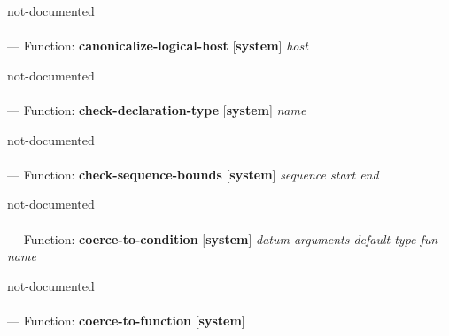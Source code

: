 \begin{adjustwidth}{5em}{5em}
not-documented
\end{adjustwidth}

\paragraph{}
\label{SYSTEM:CANONICALIZE-LOGICAL-HOST}
--- Function: \textbf{canonicalize-logical-host} [\textbf{system}] \textit{host}

\begin{adjustwidth}{5em}{5em}
not-documented
\end{adjustwidth}

\paragraph{}
\label{SYSTEM:CHECK-DECLARATION-TYPE}
--- Function: \textbf{check-declaration-type} [\textbf{system}] \textit{name}

\begin{adjustwidth}{5em}{5em}
not-documented
\end{adjustwidth}

\paragraph{}
\label{SYSTEM:CHECK-SEQUENCE-BOUNDS}
--- Function: \textbf{check-sequence-bounds} [\textbf{system}] \textit{sequence start end}

\begin{adjustwidth}{5em}{5em}
not-documented
\end{adjustwidth}

\paragraph{}
\label{SYSTEM:COERCE-TO-CONDITION}
--- Function: \textbf{coerce-to-condition} [\textbf{system}] \textit{datum arguments default-type fun-name}

\begin{adjustwidth}{5em}{5em}
not-documented
\end{adjustwidth}

\paragraph{}
\label{SYSTEM:COERCE-TO-FUNCTION}
--- Function: \textbf{coerce-to-function} [\textbf{system}] \textit{}

